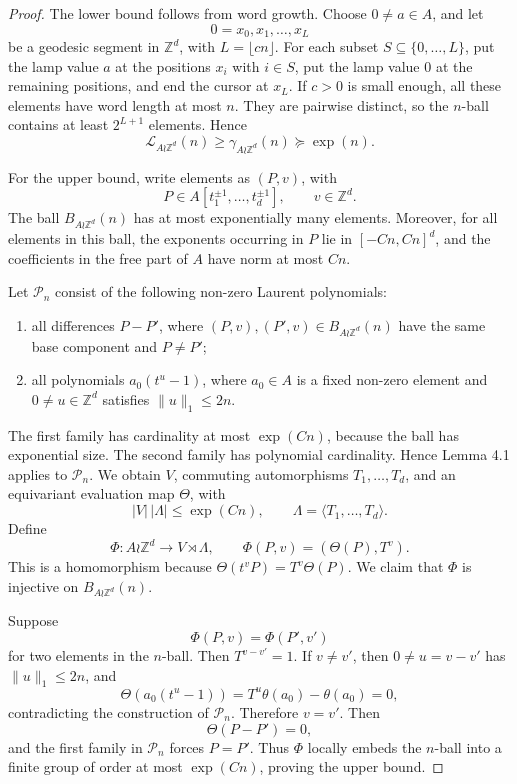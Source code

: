 \documentclass[11pt]{article}
\newcommand{\LEF}{\mathcal L}
\newcommand{\Z}{\mathbb Z}
\begin{document}
\begin{proof}
The lower bound follows from word growth. Choose \(0\neq a\in A\), and let
\[
0=x_0,x_1,\ldots,x_L
\]
be a geodesic segment in \(\Z^d\), with \(L=\lfloor cn\rfloor\). For each subset \(S\subseteq\{0,\ldots,L\}\), put the lamp value \(a\) at the positions \(x_i\) with \(i\in S\), put the lamp value \(0\) at the remaining positions, and end the cursor at \(x_L\). If \(c>0\) is small enough, all these elements have word length at most \(n\). They are pairwise distinct, so the \(n\)-ball contains at least \(2^{L+1}\) elements. Hence
\[
\LEF_{A\wr\Z^d}(n)\ge\gamma_{A\wr\Z^d}(n)\succeq\exp(n).
\]

For the upper bound, write elements as \((P,v)\), with
\[
P\in A[t_1^{\pm 1},\ldots,t_d^{\pm 1}],\qquad v\in\Z^d.
\]
The ball \(B_{A\wr\Z^d}(n)\) has at most exponentially many elements. Moreover, for all elements in this ball, the exponents occurring in \(P\) lie in \([-Cn,Cn]^d\), and the coefficients in the free part of \(A\) have norm at most \(Cn\).

Let \(\mathcal P_n\) consist of the following non-zero Laurent polynomials:
\begin{enumerate}
\item all differences \(P-P'\), where \((P,v),(P',v)\in B_{A\wr\Z^d}(n)\) have the same base component and \(P\neq P'\);
\item all polynomials \(a_0(t^u-1)\), where \(a_0\in A\) is a fixed non-zero element and \(0\neq u\in\Z^d\) satisfies \(\|u\|_1\le 2n\).
\end{enumerate}
The first family has cardinality at most \(\exp(Cn)\), because the ball has exponential size. The second family has polynomial cardinality. Hence Lemma 4.1 applies to \(\mathcal P_n\). We obtain \(V\), commuting automorphisms \(T_1,\ldots,T_d\), and an equivariant evaluation map \(\Theta\), with
\[
|V|\,|\Lambda|\le \exp(Cn),\qquad \Lambda=\langle T_1,\ldots,T_d\rangle.
\]
Define
\[
\Phi:A\wr\Z^d\to V\rtimes\Lambda,\qquad \Phi(P,v)=(\Theta(P),T^v).
\]
This is a homomorphism because \(\Theta(t^vP)=T^v\Theta(P)\). We claim that \(\Phi\) is injective on \(B_{A\wr\Z^d}(n)\).

Suppose
\[
\Phi(P,v)=\Phi(P',v')
\]
for two elements in the \(n\)-ball. Then \(T^{v-v'}=1\). If \(v\neq v'\), then \(0\neq u=v-v'\) has \(\|u\|_1\le 2n\), and
\[
\Theta(a_0(t^u-1))=T^u\theta(a_0)-\theta(a_0)=0,
\]
contradicting the construction of \(\mathcal P_n\). Therefore \(v=v'\). Then
\[
\Theta(P-P')=0,
\]
and the first family in \(\mathcal P_n\) forces \(P=P'\). Thus \(\Phi\) locally embeds the \(n\)-ball into a finite group of order at most \(\exp(Cn)\), proving the upper bound.
\end{proof}
\end{document}
